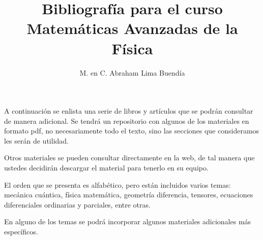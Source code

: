 
\usepackage{apacite}
\renewcommand{\refname}{Bibliografía.}
% 
\title{Bibliografía para el curso\\ \large{Matemáticas Avanzadas de la Física}\vspace{-3ex}}
\author{M. en C. Abraham Lima Buendía}
\date{ }

\vspace{-4cm}
\maketitle
\fontsize{14}{14}\selectfont
A continuación se enlista una serie de libros y artículos que se podrán consultar de manera adicional. Se tendrá un repositorio con algunos de los materiales en formato pdf, no necesariamente todo el texto, sino las secciones que consideramos les serán de utilidad.
\par
Otros materiales se pueden consultar directamente en la web, de tal manera que ustedes decidirán descargar el material para tenerlo en su equipo.
\par
El orden que se presenta es alfabético, pero están incluidos varios temas: mecánica cuántica, física matemática, geometría diferencia, tensores, ecuaciones diferenciales ordinarias y parciales, entre otras.
\par
En alguno de los temas se podrá incorporar algunos materiales adicionales más específicos.

\nocite{*}


